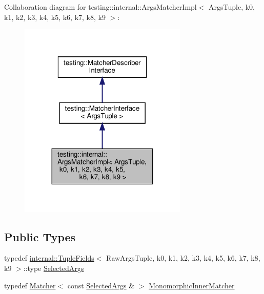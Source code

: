Collaboration diagram for testing\+:\+:internal\+:\+:Args\+Matcher\+Impl$<$ Args\+Tuple, k0, k1, k2, k3, k4, k5, k6, k7, k8, k9 $>$\+:
\nopagebreak
\begin{figure}[H]
\begin{center}
\leavevmode
\includegraphics[width=227pt]{classtesting_1_1internal_1_1_args_matcher_impl__coll__graph}
\end{center}
\end{figure}
\subsection*{Public Types}
\begin{DoxyCompactItemize}
\item 
typedef \hyperlink{classtesting_1_1internal_1_1_tuple_fields}{internal\+::\+Tuple\+Fields}$<$ Raw\+Args\+Tuple, k0, k1, k2, k3, k4, k5, k6, k7, k8, k9 $>$\+::type \hyperlink{classtesting_1_1internal_1_1_args_matcher_impl_ab061679f6251e56ccbedaf0c316d00ff}{Selected\+Args}
\item 
typedef \hyperlink{classtesting_1_1_matcher}{Matcher}$<$ const \hyperlink{classtesting_1_1internal_1_1_args_matcher_impl_ab061679f6251e56ccbedaf0c316d00ff}{Selected\+Args} \& $>$ \hyperlink{classtesting_1_1internal_1_1_args_matcher_impl_ab90d2c074b2072d6c39bf26209fb941f}{Monomorphic\+Inner\+Matcher}
\end{DoxyCompactItemize}
